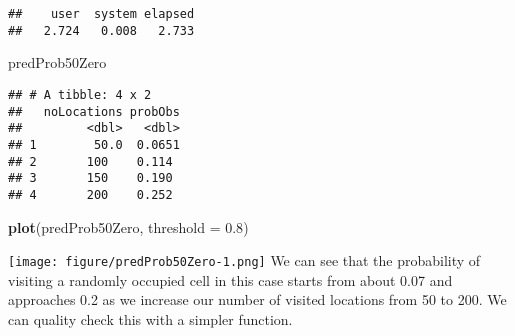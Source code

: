 \documentclass[]{article}
\newenvironment{Shaded}{\begin{snugshade}}{\end{snugshade}}
\newcommand{\KeywordTok}[1]{\textcolor[rgb]{0.13,0.29,0.53}{\textbf{#1}}}
\newcommand{\DataTypeTok}[1]{\textcolor[rgb]{0.13,0.29,0.53}{#1}}
\newcommand{\DecValTok}[1]{\textcolor[rgb]{0.00,0.00,0.81}{#1}}
\newcommand{\FloatTok}[1]{\textcolor[rgb]{0.00,0.00,0.81}{#1}}
\newcommand{\StringTok}[1]{\textcolor[rgb]{0.31,0.60,0.02}{#1}}
\newcommand{\CommentTok}[1]{\textcolor[rgb]{0.56,0.35,0.01}{\textit{#1}}}
\newcommand{\ControlFlowTok}[1]{\textcolor[rgb]{0.13,0.29,0.53}{\textbf{#1}}}
\newcommand{\OperatorTok}[1]{\textcolor[rgb]{0.81,0.36,0.00}{\textbf{#1}}}
\newcommand{\NormalTok}[1]{#1}
\begin{document}
\begin{verbatim}
##    user  system elapsed 
##   2.724   0.008   2.733
\end{verbatim}

\begin{Shaded}
\begin{Highlighting}[]
\NormalTok{predProb50Zero}
\end{Highlighting}
\end{Shaded}

\begin{verbatim}
## # A tibble: 4 x 2
##   noLocations probObs
##         <dbl>   <dbl>
## 1        50.0  0.0651
## 2       100    0.114 
## 3       150    0.190 
## 4       200    0.252
\end{verbatim}

\begin{Shaded}
\begin{Highlighting}[]
\KeywordTok{plot}\NormalTok{(predProb50Zero, }\DataTypeTok{threshold =} \FloatTok{0.8}\NormalTok{)}
\end{Highlighting}
\end{Shaded}

\texttt{[image: figure/predProb50Zero-1.png]} We can see that the
probability of visiting a randomly occupied cell in this case starts
from about 0.07 and approaches 0.2 as we increase our number of visited
locations from 50 to 200. We can quality check this with a simpler
function.

\begin{Shaded}
\end{Shaded}
\end{document}
